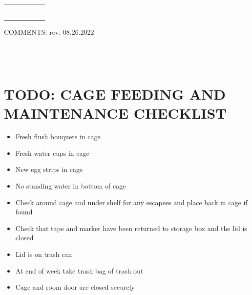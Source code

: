 \documentclass{sop_class}[overrideChapters] %
\providecommand{\tightlist}{%
  \setlength{\itemsep}{0pt}\setlength{\parskip}{0pt}}
\begin{document}
{\begin{table}[!htbp]
\begin{threeparttable}
\begin{tabular}{|l|l|l|l|l|l|}
            \hline
            {} & {} & {} & {} & {} & {}\\
            \hline
            {} & {} & {} & {} & {} & {}\\
            \hline
            {} & {} & {} & {} & {} & {}\\
            \hline
            {} & {} & {} & {} & {} & {}\\
            \hline
            {} & {} & {} & {} & {} & {}\\
            \hline
            {} & {} & {} & {} & {} & {}\\
            \hline
            {} & {} & {} & {} & {} & {}\\
            \hline
            \end{tabular}
        \begin{tablenotes}
            \small
            \item COMMENTS: \hfill{} rev. 08.26.2022 \\
            \\
            \\
            \\
        \end{tablenotes}
    \end{threeparttable}
\end{table}
\clearpage
\newpage

\hypertarget{todo-cage-feeding-and-maintenance-checklist}{%
\section{TODO: CAGE FEEDING AND MAINTENANCE CHECKLIST}\label{todo-cage-feeding-and-maintenance-checklist}}
\begin{itemize}
\tightlist
\item
  Fresh flush bouquets in cage
\item
  Fresh water cups in cage
\item
  New egg strips in cage
\item
  No standing water in bottom of cage
\item
  Check around cage and under shelf for any escapees and place back in
  cage if found
\item
  Check that tape and marker have been returned to storage box and the
  lid is closed
\item
  Lid is on trash can
\item
  At end of week take trash bag of trash out
\item
  Cage and room door are closed securely
\end{itemize}
\let\chapter\appendixChapter
{}\raggedright\doublespacing}                       %
\end{document}
